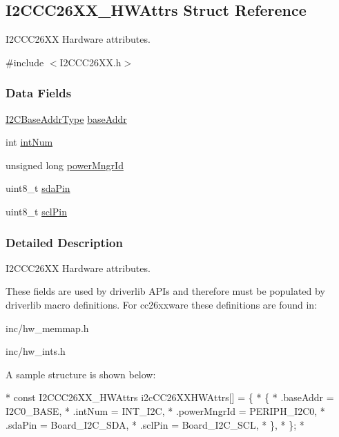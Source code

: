 \subsection{I2\-C\-C\-C26\-X\-X\-\_\-\-H\-W\-Attrs Struct Reference}
\label{struct_i2_c_c_c26_x_x___h_w_attrs}


I2\-C\-C\-C26\-X\-X Hardware attributes.  




{\ttfamily \#include $<$I2\-C\-C\-C26\-X\-X.\-h$>$}

\subsubsection*{Data Fields}
\begin{DoxyCompactItemize}
\item 
\hyperlink{_i2_c_c_c26_x_x_8h_a6e087d828c4463de0061d8205b2245d8}{I2\-C\-Base\-Addr\-Type} \hyperlink{struct_i2_c_c_c26_x_x___h_w_attrs_a45cbf1a9044afdd06f0aa82319c977ef}{base\-Addr}
\item 
int \hyperlink{struct_i2_c_c_c26_x_x___h_w_attrs_a429ce62b1e66221f0b702729cd1ac20e}{int\-Num}
\item 
unsigned long \hyperlink{struct_i2_c_c_c26_x_x___h_w_attrs_aac2a311e3ef7b95a85b648026ac60780}{power\-Mngr\-Id}
\item 
uint8\-\_\-t \hyperlink{struct_i2_c_c_c26_x_x___h_w_attrs_a011bf667fa99fa23a5609d74cb729cb7}{sda\-Pin}
\item 
uint8\-\_\-t \hyperlink{struct_i2_c_c_c26_x_x___h_w_attrs_a05531669bc614278c181e2720499f1b6}{scl\-Pin}
\end{DoxyCompactItemize}


\subsubsection{Detailed Description}
I2\-C\-C\-C26\-X\-X Hardware attributes. 

These fields are used by driverlib A\-P\-Is and therefore must be populated by driverlib macro definitions. For cc26xxware these definitions are found in\-:
\begin{DoxyItemize}
\item inc/hw\-\_\-memmap.\-h
\item inc/hw\-\_\-ints.\-h
\end{DoxyItemize}

A sample structure is shown below\-: 
\begin{DoxyCode}
*  \textcolor{keyword}{const} I2CCC26XX_HWAttrs i2cCC26XXHWAttrs[] = \{
*      \{
*         .baseAddr = I2C0\_BASE,
*         .intNum = INT\_I2C,
*         .powerMngrId = PERIPH\_I2C0,
*         .sdaPin = Board\_I2C\_SDA,
*         .sclPin = Board\_I2C\_SCL,
*      \},
*  \};
*  
\end{DoxyCode}
 

